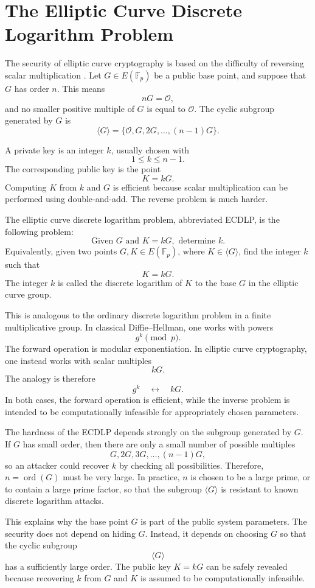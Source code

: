 \documentclass[12pt,a4paper]{article}
\begin{document}
\section{The Elliptic Curve Discrete Logarithm Problem}

The security of elliptic curve cryptography is based on the difficulty of reversing scalar multiplication \cite{koblitz1987,trappe-washington2006}. Let \(G \in E(\mathbb{F}_p)\) be a public base point, and suppose that \(G\) has order \(n\). This means
\[nG=\mathcal{O},\]
and no smaller positive multiple of \(G\) is equal to \(\mathcal{O}\). The cyclic subgroup generated by \(G\) is
\[\langle G\rangle=\{\mathcal{O},G,2G,\ldots,(n-1)G\}.\]

A private key is an integer \(k\), usually chosen with
\[1\leq k\leq n-1.\]
The corresponding public key is the point
\[K=kG.\]
Computing \(K\) from \(k\) and \(G\) is efficient because scalar multiplication can be performed using double-and-add. The reverse problem is much harder.

The elliptic curve discrete logarithm problem, abbreviated ECDLP, is the following problem:
\[\text{Given }G\text{ and }K=kG,\text{ determine }k.\]
Equivalently, given two points \(G,K \in E(\mathbb{F}_p)\), where \(K \in \langle G\rangle\), find the integer \(k\) such that
\[K=kG.\]
The integer \(k\) is called the discrete logarithm of \(K\) to the base \(G\) in the elliptic curve group.

This is analogous to the ordinary discrete logarithm problem in a finite multiplicative group. In classical Diffie--Hellman, one works with powers
\[g^k \pmod p.\]
The forward operation is modular exponentiation. In elliptic curve cryptography, one instead works with scalar multiples
\[kG.\]
The analogy is therefore
\[g^k \quad \longleftrightarrow \quad kG.\]
In both cases, the forward operation is efficient, while the inverse problem is intended to be computationally infeasible for appropriately chosen parameters.

The hardness of the ECDLP depends strongly on the subgroup generated by \(G\). If \(G\) has small order, then there are only a small number of possible multiples
\[G,2G,3G,\ldots,(n-1)G,\]
so an attacker could recover \(k\) by checking all possibilities. Therefore, \(n=\operatorname{ord}(G)\) must be very large. In practice, \(n\) is chosen to be a large prime, or to contain a large prime factor, so that the subgroup \(\langle G\rangle\) is resistant to known discrete logarithm attacks.

This explains why the base point \(G\) is part of the public system parameters. The security does not depend on hiding \(G\). Instead, it depends on choosing \(G\) so that the cyclic subgroup
\[\langle G\rangle\]
has a sufficiently large order. The public key \(K=kG\) can be safely revealed because recovering \(k\) from \(G\) and \(K\) is assumed to be computationally infeasible.
\end{document}

